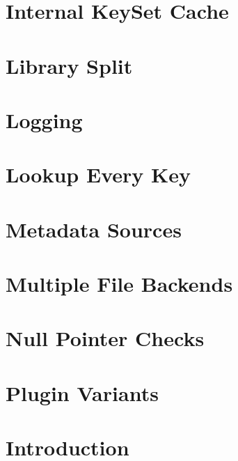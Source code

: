 \documentclass[twoside]{book}
\newcommand{\+}{\discretionary{\mbox{\scriptsize$\hookleftarrow$}}{}{}}
\begin{document}
\chapter{Internal Key\+Set Cache}
\label{doc_decisions_internal_cache_md}

\chapter{Library Split}
\label{doc_decisions_library_split_md}

\chapter{Logging}
\label{doc_decisions_logging_md}

\chapter{Lookup Every Key}
\label{doc_decisions_lookup_every_key_md}

\chapter{Metadata Sources}
\label{doc_decisions_metadata_sources_md}

\chapter{Multiple File Backends}
\label{doc_decisions_multiple_file_backends_md}

\chapter{Null Pointer Checks}
\label{doc_decisions_null_pointer_checks_md}

\chapter{Plugin Variants}
\label{doc_decisions_plugin_variants_md}

\chapter{Introduction}
\label{doc_decisions_README_md}

\end{document}
